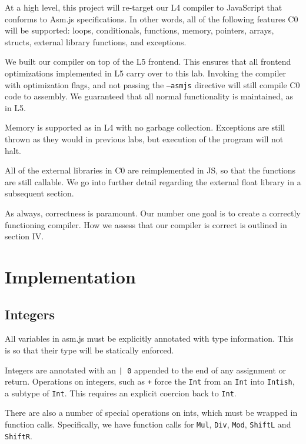 \documentclass[twoside]{article}
\begin{document}
\begin{multicols}{2}
At a high level, this project will re-target our L4 compiler to JavaScript that
conforms to Asm.js specifications. In other
words, all of the following features C0 will be supported: loops, conditionals,
functions, memory, pointers, arrays, structs, external library functions, and
exceptions.

  We built our compiler on top of the L5 frontend. This ensures that all 
  frontend optimizations implemented in L5 carry over to this lab. Invoking
  the compiler with optimization flags, and not passing the \texttt{--asmjs}
  directive will still compile C0 code to assembly. We guaranteed that all
  normal functionality is maintained, as in L5. 

  Memory is supported as in L4 with no garbage collection. Exceptions are
  still thrown as they would in previous labs, but execution of the program
  will not halt.

  All of the external libraries in C0 are reimplemented in JS, so that the functions
  are still callable. We go into further detail regarding the external float library
  in a subsequent section. 

As always, correctness is paramount. Our number one goal is to create a correctly
functioning compiler. How we assess that our compiler is correct is outlined in
section IV.


\section{Implementation}

  \subsection{Integers}
    All variables in asm.js must be explicitly annotated with type information.
    This is so that their type will be statically enforced.

    Integers are annotated with an \texttt{| 0} appended to the end of any
    assignment or return. Operations on integers, such as \texttt{+} force
    the \texttt{Int} from an \texttt{Int} into \texttt{Intish}, a subtype of \texttt{Int}. 
    This requires an explicit coercion back to \texttt{Int}.

    There are also a number of special operations on ints, which must be
    wrapped in function calls. Specifically, we have function calls for \texttt{Mul},
    \texttt{Div}, \texttt{Mod}, \texttt{ShiftL} and \texttt{ShiftR}. 
    

\end{multicols}
\end{document}
